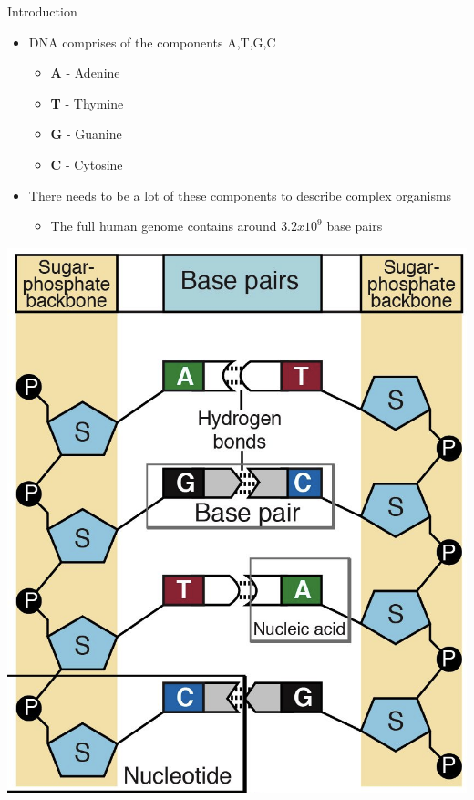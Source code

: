 \documentclass{beamer}
\begin{document}
    \begin{frame}{Introduction}
        \begin{itemize}
            \item DNA comprises of the components A,T,G,C
            \begin{itemize}
                \item \textbf{A} - Adenine
                \item \textbf{T} - Thymine
                \item \textbf{G} - Guanine
                \item \textbf{C} - Cytosine
            \end{itemize}
            \item There needs to be a lot of these components to describe complex organisms
            \begin{itemize}
                \item The full human genome contains around $3.2 x 10^9$ base pairs \cite[p.~4]{introgenomics}
            \end{itemize}
        \end{itemize}
        \centering
        \includegraphics[scale=0.1]{gene-base-pair.png}
    \end{frame}
    
\end{document}
